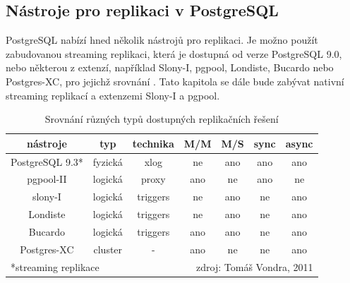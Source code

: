       \subsection{Nástroje pro replikaci v PostgreSQL}

      PostgreSQL nabízí hned několik nástrojů pro replikaci. Je možno použít zabudovanou streaming replikaci, která je dostupná od verze PostgreSQL 9.0, nebo některou z extenzí, například Slony-I, pgpool, Londiste, Bucardo nebo Postgres-XC, pro jejichž srovnání . Tato kapitola se dále bude zabývat nativní streaming replikací a extenzemi Slony-I a pgpool.

        \begin{table}[H]
          \caption{Srovnání různých typů dostupných replikačních řešení}
          \label{tSrovnaniReplikace}
          \begin{footnotesize}
            \begin{center}
              \begin{tabular}{|c|cccccc|}
                \hline
                {\bf \color{purpurova7}nástroje}	& {\bf \color{purpurova7}typ} & {\bf \color{purpurova7}technika} & {\bf \color{purpurova7}M/M} & {\bf \color{purpurova7}M/S} & {\bf \color{purpurova7}sync} & {\bf \color{purpurova7}async} \\
                \hline
                PostgreSQL 9.3* & fyzická & xlog     & ne  & ano & ano & ano \\ 
                      pgpool-II & logická & proxy    & ano & ne  & ano & ne  \\
                        slony-I & logická & triggers & ne  & ano & ne  & ano \\ 
                       Londiste & logická & triggers & ne  & ano & ne  & ano \\ 
                        Bucardo & logická & triggers & ano & ano & ne  & ano \\ 
                    Postgres-XC & cluster & -        & ano & ne  & ne  & ano \\ 
                \hline
                \multicolumn{3}{l}{\scriptsize{*streaming replikace}} & \multicolumn{4}{r}{\scriptsize{zdroj: Tomáš Vondra, 2011}}\\
              \end{tabular}
            \end{center}
          \end{footnotesize}
        \end{table}


